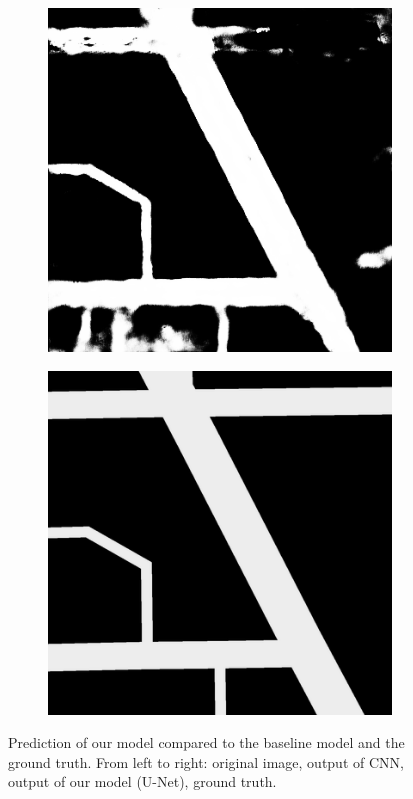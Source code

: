 \documentclass[10pt,conference,compsocconf]{IEEEtran}
\begin{document}
\begin{figure}[ht]
\begin{subfigure}{0.20\linewidth}
    \end{subfigure}
    \begin{subfigure}{0.20\linewidth}
        \centering
        \includegraphics[width=0.9\linewidth]{doc/images/shadow_unet.png}
    \end{subfigure}
    \begin{subfigure}{0.20\linewidth}
        \centering
        \includegraphics[width=0.9\linewidth]{doc/images/shadow_gt.png}
    \end{subfigure}

    \caption{Prediction of our model compared to the baseline model and the ground truth. From left to right: original image, output of CNN, output of our model (U-Net), ground truth.}
    \label{fig:output_comparison}
\end{figure}
\end{document}
